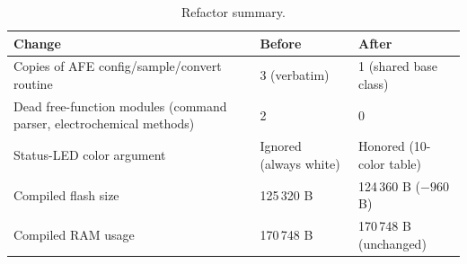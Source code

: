 \begin{table}[h]
\centering
\footnotesize
\setlength{\tabcolsep}{4pt}
\caption{Refactor summary.}
\label{tab:refactor}
\begin{tabular}{@{}p{4.3cm}p{1.7cm}p{1.9cm}@{}}
\toprule
Change & Before & After \\
\midrule
Copies of AFE config/sample/convert routine & 3 (verbatim) & 1 (shared base class) \\
Dead free-function modules (command parser, electrochemical methods) & 2 & 0 \\
Status-LED color argument & Ignored (always white) & Honored (10-color table) \\
Compiled flash size & 125\,320 B & 124\,360 B ($-960$ B) \\
Compiled RAM usage & 170\,748 B & 170\,748 B (unchanged) \\
\bottomrule
\end{tabular}
\end{table}

